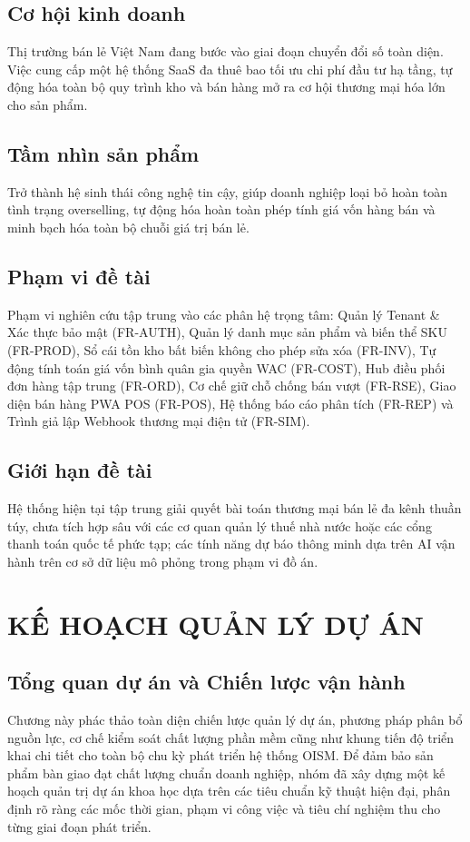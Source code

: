 \documentclass[12pt,a4paper]{report}
\begin{document}
	\section{Cơ hội kinh doanh}
	Thị trường bán lẻ Việt Nam đang bước vào giai đoạn chuyển đổi số toàn diện. Việc cung cấp một hệ thống SaaS đa thuê bao tối ưu chi phí đầu tư hạ tầng, tự động hóa toàn bộ quy trình kho và bán hàng mở ra cơ hội thương mại hóa lớn cho sản phẩm.
	
	\section{Tầm nhìn sản phẩm}
	Trở thành hệ sinh thái công nghệ tin cậy, giúp doanh nghiệp loại bỏ hoàn toàn tình trạng overselling, tự động hóa hoàn toàn phép tính giá vốn hàng bán và minh bạch hóa toàn bộ chuỗi giá trị bán lẻ.
	
	\section{Phạm vi đề tài}
	Phạm vi nghiên cứu tập trung vào các phân hệ trọng tâm: Quản lý Tenant \& Xác thực bảo mật (FR-AUTH), Quản lý danh mục sản phẩm và biến thể SKU (FR-PROD), Sổ cái tồn kho bất biến không cho phép sửa xóa (FR-INV), Tự động tính toán giá vốn bình quân gia quyền WAC (FR-COST), Hub điều phối đơn hàng tập trung (FR-ORD), Cơ chế giữ chỗ chống bán vượt (FR-RSE), Giao diện bán hàng PWA POS (FR-POS), Hệ thống báo cáo phân tích (FR-REP) và Trình giả lập Webhook thương mại điện tử (FR-SIM).
	
	\section{Giới hạn đề tài}
	Hệ thống hiện tại tập trung giải quyết bài toán thương mại bán lẻ đa kênh thuần túy, chưa tích hợp sâu với các cơ quan quản lý thuế nhà nước hoặc các cổng thanh toán quốc tế phức tạp; các tính năng dự báo thông minh dựa trên AI vận hành trên cơ sở dữ liệu mô phỏng trong phạm vi đồ án.
	
	\chapter{KẾ HOẠCH QUẢN LÝ DỰ ÁN}
	\section{Tổng quan dự án và Chiến lược vận hành}
	Chương này phác thảo toàn diện chiến lược quản lý dự án, phương pháp phân bổ nguồn lực, cơ chế kiểm soát chất lượng phần mềm cũng như khung tiến độ triển khai chi tiết cho toàn bộ chu kỳ phát triển hệ thống OISM. Để đảm bảo sản phẩm bàn giao đạt chất lượng chuẩn doanh nghiệp, nhóm đã xây dựng một kế hoạch quản trị dự án khoa học dựa trên các tiêu chuẩn kỹ thuật hiện đại, phân định rõ ràng các mốc thời gian, phạm vi công việc và tiêu chí nghiệm thu cho từng giai đoạn phát triển.
	
\end{document}
